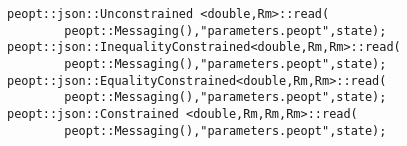 \begin{lstlisting}[style=C++]
peopt::json::Unconstrained <double,Rm>::read(
        peopt::Messaging(),"parameters.peopt",state);
peopt::json::InequalityConstrained<double,Rm,Rm>::read(
        peopt::Messaging(),"parameters.peopt",state);
peopt::json::EqualityConstrained<double,Rm,Rm>::read(
        peopt::Messaging(),"parameters.peopt",state);
peopt::json::Constrained <double,Rm,Rm,Rm>::read(
        peopt::Messaging(),"parameters.peopt",state);
\end{lstlisting}
